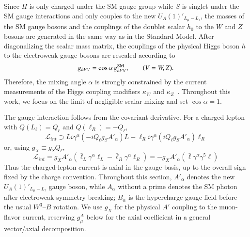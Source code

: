 \documentclass[onecolumn, aps, nofootinbib, prd, preprint, floats, floatfix, amsmath, amssymb, superscriptaddress, preprintnumbers]{revtex4-1}
\newcommand{\zb}[1]{{\color{blue} {#1}}}
\begin{document}
\zb{Since $H$ is only charged under the SM gauge group while $S$ is singlet under the SM gauge interactions and only couples to the new $U_A(1)'_{L_\mu-L_\tau}$, the masses of the SM gauge bosons and the couplings of the doublet scalar $h_0$ to the $W$ and $Z$ bosons are generated in the same way as in the Standard Model. After diagonalizing the scalar mass matrix, the couplings of the physical Higgs boson $h$ to the electroweak gauge bosons are rescaled according to
\begin{equation}
g_{hVV} = \cos\alpha \, g_{hVV}^{\rm SM},
\qquad (V=W,Z).
\end{equation}
Therefore, the mixing angle $\alpha$ is strongly constrained by the current measurements of the Higgs coupling modifiers $\kappa_W$ and $\kappa_Z$~\cite{ATLAS:2022vkf,CMS:2022dwd}. Throughout this work, we focus on the limit of negligible scalar mixing and set
$\cos\alpha = 1$.
}


The gauge interaction follows from the covariant derivative. For a charged lepton with \(Q(L_\ell)=Q_\ell\) and \(Q(\ell_R)=-Q_\ell\),
\begin{equation}
    \mathcal{L}_{int} \supset \bar{L} i \gamma^\alpha (-i Q_\ell g_S A'_\alpha) L + \bar{\ell}_R i \gamma^\alpha (i Q_\ell g_S A'_\alpha) \ell_R
\end{equation}
or, using \(g_X\equiv g_SQ_\ell\),
\begin{equation}
    \mathcal{L}_{int} = g_X A'_\alpha \left( \bar{\ell}_L \gamma^\alpha \ell_L - \bar{\ell}_R \gamma^\alpha \ell_R \right) = -g_X A'_\alpha (\bar{\ell} \gamma^\alpha \gamma^5 \ell)
\end{equation}
Thus the charged-lepton current is axial in the gauge basis, up to the overall sign fixed by the charge convention. Throughout this section, $A'_\alpha$ denotes the new $U_A(1)'_{L_\mu-L_\tau}$ gauge boson, while $A_\alpha$ without a prime denotes the SM photon after electroweak symmetry breaking; $B_\alpha$ is the hypercharge gauge field before the usual $W^3$--$B$ rotation. We use \(g_X\) for the physical \(A'\) coupling to the muon-flavor current, reserving \(g_\mu^A\) below for the axial coefficient in a general vector/axial decomposition.
\end{document}
